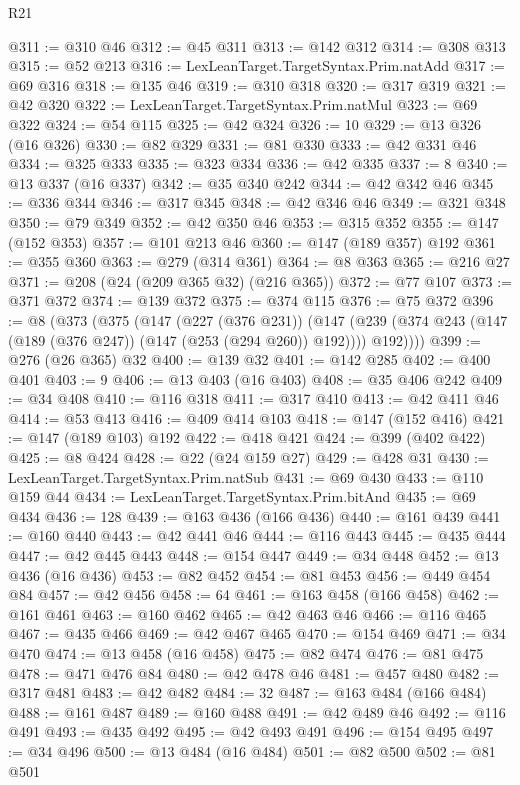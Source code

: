 \begin{lexlean}{R21}
\begin{coremodule}
@311 := @310 @46
@312 := @45 @311
@313 := @142 @312
@314 := @308 @313
@315 := @52 @213
@316 := LexLeanTarget.TargetSyntax.Prim.natAdd
@317 := @69 @316
@318 := @135 @46
@319 := @310 @318
@320 := @317 @319
@321 := @42 @320
@322 := LexLeanTarget.TargetSyntax.Prim.natMul
@323 := @69 @322
@324 := @54 @115
@325 := @42 @324
@326 := 10
@329 := @13 @326 (@16 @326)
@330 := @82 @329
@331 := @81 @330
@333 := @42 @331 @46
@334 := @325 @333
@335 := @323 @334
@336 := @42 @335
@337 := 8
@340 := @13 @337 (@16 @337)
@342 := @35 @340 @242
@344 := @42 @342 @46
@345 := @336 @344
@346 := @317 @345
@348 := @42 @346 @46
@349 := @321 @348
@350 := @79 @349
@352 := @42 @350 @46
@353 := @315 @352
@355 := @147 (@152 @353)
@357 := @101 @213 @46
@360 := @147 (@189 @357) @192
@361 := @355 @360
@363 := @279 (@314 @361)
@364 := @8 @363
@365 := @216 @27
@371 := @208 (@24 (@209 @365 @32) (@216 @365))
@372 := @77 @107
@373 := @371 @372
@374 := @139 @372
@375 := @374 @115
@376 := @75 @372
@396 := @8
    (@373
      (@375
        (@147
          (@227 (@376 @231))
          (@147 (@239 (@374 @243 (@147 (@189 (@376 @247)) (@147 (@253 (@294 @260)) @192)))) @192))))
@399 := @276 (@26 @365) @32
@400 := @139 @32
@401 := @142 @285
@402 := @400 @401
@403 := 9
@406 := @13 @403 (@16 @403)
@408 := @35 @406 @242
@409 := @34 @408
@410 := @116 @318
@411 := @317 @410
@413 := @42 @411 @46
@414 := @53 @413
@416 := @409 @414 @103
@418 := @147 (@152 @416)
@421 := @147 (@189 @103) @192
@422 := @418 @421
@424 := @399 (@402 @422)
@425 := @8 @424
@428 := @22 (@24 @159 @27)
@429 := @428 @31
@430 := LexLeanTarget.TargetSyntax.Prim.natSub
@431 := @69 @430
@433 := @110 @159 @44
@434 := LexLeanTarget.TargetSyntax.Prim.bitAnd
@435 := @69 @434
@436 := 128
@439 := @163 @436 (@166 @436)
@440 := @161 @439
@441 := @160 @440
@443 := @42 @441 @46
@444 := @116 @443
@445 := @435 @444
@447 := @42 @445 @443
@448 := @154 @447
@449 := @34 @448
@452 := @13 @436 (@16 @436)
@453 := @82 @452
@454 := @81 @453
@456 := @449 @454 @84
@457 := @42 @456
@458 := 64
@461 := @163 @458 (@166 @458)
@462 := @161 @461
@463 := @160 @462
@465 := @42 @463 @46
@466 := @116 @465
@467 := @435 @466
@469 := @42 @467 @465
@470 := @154 @469
@471 := @34 @470
@474 := @13 @458 (@16 @458)
@475 := @82 @474
@476 := @81 @475
@478 := @471 @476 @84
@480 := @42 @478 @46
@481 := @457 @480
@482 := @317 @481
@483 := @42 @482
@484 := 32
@487 := @163 @484 (@166 @484)
@488 := @161 @487
@489 := @160 @488
@491 := @42 @489 @46
@492 := @116 @491
@493 := @435 @492
@495 := @42 @493 @491
@496 := @154 @495
@497 := @34 @496
@500 := @13 @484 (@16 @484)
@501 := @82 @500
@502 := @81 @501

\end{coremodule}
\end{lexlean}
